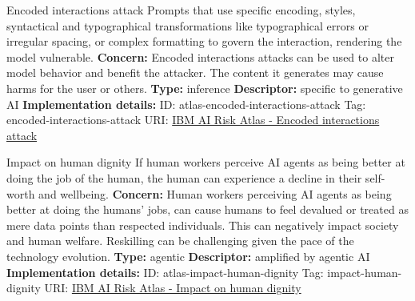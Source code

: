\begin{definitionbox}{Encoded interactions attack}
Prompts that use specific encoding, styles, syntactical and typographical transformations like typographical errors or irregular spacing, or complex formatting to govern the interaction, rendering the model vulnerable.\newline\newline
\textbf{Concern: }Encoded interactions attacks can be used to alter model behavior and benefit the attacker. The content it generates may cause harms for the user or others.\newline\newline
\textbf{Type: }inference\newline
\textbf{Descriptor: }specific to generative AI \newline\newline
\textbf{Implementation details: } \newline
ID: atlas-encoded-interactions-attack \newline
Tag: encoded-interactions-attack \newline
URI:  \href{https://www.ibm.com/docs/en/watsonx/saas?topic=SSYOK8/wsj/ai-risk-atlas/encoded-interactions-attack.html}{IBM AI Risk Atlas - Encoded interactions attack}\newline
\end{definitionbox}
\begin{definitionbox}{Impact on human dignity}
If human workers perceive AI agents as being better at doing the job of the human, the human can experience a decline in their self-worth and wellbeing.\newline\newline
\textbf{Concern: }Human workers perceiving AI agents as being better at doing the humans' jobs, can cause humans to feel devalued or treated as mere data points than respected individuals. This can negatively impact society and human welfare. Reskilling can be challenging given the pace of the technology evolution.\newline\newline
\textbf{Type: }agentic\newline
\textbf{Descriptor: }amplified by agentic AI \newline\newline
\textbf{Implementation details: } \newline
ID: atlas-impact-human-dignity \newline
Tag: impact-human-dignity \newline
URI:  \href{https://www.ibm.com/docs/en/watsonx/saas?topic=SSYOK8/wsj/ai-risk-atlas/impact-human-dignity.html}{IBM AI Risk Atlas - Impact on human dignity}\newline
\end{definitionbox}
